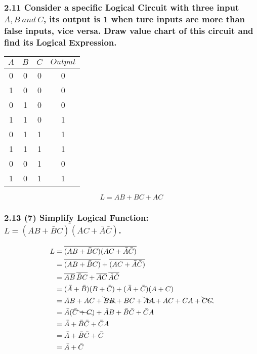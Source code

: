     \subsubsection{2.11 \textnormal{Consider a specific Logical Circuit with three input $A,B~and~C$, its output is 1 when ture inputs are more than false inputs, vice versa. Draw value chart of this circuit and find its Logical Expression}.}
    {\color{hwSolution}
        \begin{center}
            \begin{tabular}{c c c|c}
                $A$ & $B$ & $C$ & $Output$ \\
                \hline
                0   & 0   & 0   & 0 \\
                1   & 0   & 0   & 0 \\
                0   & 1   & 0   & 0 \\
                1   & 1   & 0   & 1 \\
                0   & 1   & 1   & 1 \\
                1   & 1   & 1   & 1 \\
                0   & 0   & 1   & 0 \\
                1   & 0   & 1   & 1 \\
            \end{tabular}
            \[L = AB + BC + AC\]
        \end{center}
    }
    \subsubsection{2.13 (7) \textnormal{Simplify Logical Function: $L=\overline{(AB+\bar{B}C)(AC+\bar{A}\bar{C})}$}.}
    {\color{hwSolution}
        \begin{align*}
            L
            &= \overline{(AB+\bar{B}C)(AC+\bar{A}\bar{C})}\\
            &= \overline{(AB+\bar{B}C)}+\overline{(AC+\bar{A}\bar{C})}\\
            &= \overline{AB}\,\overline{\bar{B}C}+\overline{AC}\,\overline{\bar{A}\bar{C}}\\
            &= (\bar{A}+\bar{B})(B+\bar{C}) + (\bar{A}+\bar{C})(A+C)\\
            &= \bar{A}B+\bar{A}\bar{C}+\bcancel{\bar{B}B}+\bar{B}\bar{C}+\bcancel{\bar{A}A}+\bar{A}C+\bar{C}A+\bcancel{\bar{C}C}\\
            &= \bar{A}(\bcancel{\bar{C}+C})+\bar{A}B+\bar{B}\bar{C}+\bar{C}A\\
            &= \bar{A}+\bar{B}\bar{C}+\bar{C}A\\
            &= \bar{A}+\bar{B}\bar{C}+\bar{C}\\
            &= \bar{A}+\bar{C}
        \end{align*}
    }
